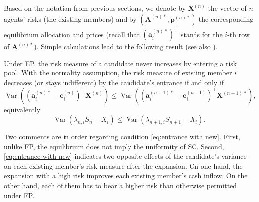 \documentclass[fleqn,mnsc,nonblindrev]{informs4}
\newcommand{\Var}{\operatorname{Var}}
\begin{document}
Based on the notation from previous sections, we denote by $\mathbf{X}^{(n)}$ the vector of $n$ agents' risks (the existing members) and by $(\mathbf{A}^{(n)*}, \mathbf{p}^{(n)*})$ the corresponding equilibrium allocation and prices (recall that $(\mathbf{a}_{i}^{(n)*})^\top$ stands for the $i$-th row of $\mathbf{A}^{(n)*}$). Simple calculations lead to the following result (see also \cite[Corollary 2.6]{anthropelos2017}).
\begin{theorem}\label{thm:newpricing_mainthm_withoutsamecorr}
Under EP, the risk measure of a candidate never increases by entering a risk pool. With the normality assumption, the risk measure of existing member $i$ decreases (or stays indifferent) by the candidate's entrance if and only if   {$\Var((\mathbf{a}_{i}^{(n)*}-\mathbf{e}_{i}^{(n)})^\top\mathbf{X}^{(n)})\leq\Var((\mathbf{a}_{i}^{(n+1)*}-\mathbf{e}_{i}^{(n+1)})^\top\mathbf{X}^{(n+1)*}),$} equivalently 
\begin{equation}\label{eq:entrance with new}
\Var(\lambda_{n,i}S_n-X_i)\leq \Var(\lambda_{n+1,i}S_{n+1}-X_i).
\end{equation}
\end{theorem}
Two comments are in order regarding condition \eqref{eq:entrance with new}. First, unlike FP, the equilibrium does not imply the uniformity of SC. Second, \eqref{eq:entrance with new} indicates two opposite effects of the candidate's variance on each existing member's risk measure after the expansion. On one hand, the expansion with a high risk improves each existing member's cash inflow. On the other hand, each of them has to bear a higher risk than otherwise permitted under FP.  
\end{document}
